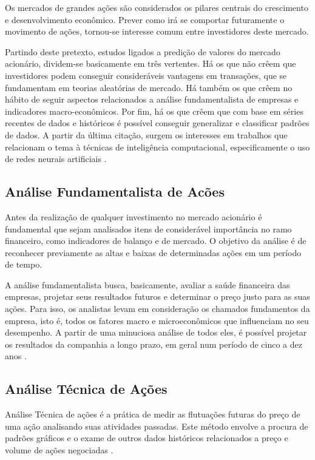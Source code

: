 Os mercados de grandes ações são considerados os pilares centrais do crescimento e desenvolvimento econômico. Prever como irá se comportar futuramente o movimento de ações, tornou-se interesse comum entre investidores deste mercado.

Partindo deste pretexto, estudos ligados a predição de valores do mercado acionário, dividem-se basicamente em três vertentes. Há os que não crêem que investidores podem conseguir consideráveis vantagens em transações, que se fundamentam em teorias aleatórias de mercado. Há também os que crêem no hábito de seguir aspectos relacionados a análise fundamentalista de empresas e indicadores macro-econômicos. Por fim, há os que crêem que com base em séries recentes de dados e históricos é possível conseguir generalizar e classificar padrões de dados. A partir da última citação, surgem os interesses em trabalhos que relacionam o tema à técnicas de inteligência computacional, especificamente o uso de redes neurais artificiais \cite{pereira}.

\subsection{Análise Fundamentalista de Acões}
Antes da realização de qualquer investimento no mercado acionário é fundamental que sejam analisados itens de considerável importância no ramo financeiro, como indicadores de balanço e de mercado. O objetivo da análise é de reconhecer previamente as altas e baixas de determinadas ações em um período de tempo.

A análise fundamentalista busca, basicamente, avaliar a saúde financeira das empresas, projetar seus resultados futuros e determinar o preço justo para as suas ações. Para isso, os analistas levam em consideração os chamados fundamentos da empresa, isto é, todos os fatores macro e microeconômicos que influenciam no seu desempenho. A partir de uma minuciosa análise de todos eles, é possível projetar os resultados da companhia a longo prazo, em geral num período de cinco a dez anos \cite{exame}.

\subsection{Análise Técnica de Ações}\label{ch:analise-tecnica}
Análise Técnica de ações é a prática de medir as flutuações futuras do preço de uma ação analisando suas atividades passadas. Este método envolve a procura de padrões gráficos e o exame de outros dados históricos relacionados a preço e volume de ações negociadas \cite{tororadar}.
 
